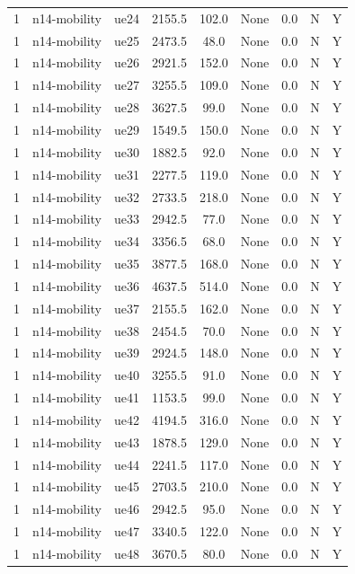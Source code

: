 \begin{table}[ht]
\begin{tabular}{|c|c|c|c|c|c|c|c|c|}
1 & n14-mobility & ue24 & 2155.5 & 102.0 & None & 0.0 & N & Y \\
1 & n14-mobility & ue25 & 2473.5 & 48.0 & None & 0.0 & N & Y \\
1 & n14-mobility & ue26 & 2921.5 & 152.0 & None & 0.0 & N & Y \\
1 & n14-mobility & ue27 & 3255.5 & 109.0 & None & 0.0 & N & Y \\
1 & n14-mobility & ue28 & 3627.5 & 99.0 & None & 0.0 & N & Y \\
1 & n14-mobility & ue29 & 1549.5 & 150.0 & None & 0.0 & N & Y \\
1 & n14-mobility & ue30 & 1882.5 & 92.0 & None & 0.0 & N & Y \\
1 & n14-mobility & ue31 & 2277.5 & 119.0 & None & 0.0 & N & Y \\
1 & n14-mobility & ue32 & 2733.5 & 218.0 & None & 0.0 & N & Y \\
1 & n14-mobility & ue33 & 2942.5 & 77.0 & None & 0.0 & N & Y \\
1 & n14-mobility & ue34 & 3356.5 & 68.0 & None & 0.0 & N & Y \\
1 & n14-mobility & ue35 & 3877.5 & 168.0 & None & 0.0 & N & Y \\
1 & n14-mobility & ue36 & 4637.5 & 514.0 & None & 0.0 & N & Y \\
1 & n14-mobility & ue37 & 2155.5 & 162.0 & None & 0.0 & N & Y \\
1 & n14-mobility & ue38 & 2454.5 & 70.0 & None & 0.0 & N & Y \\
1 & n14-mobility & ue39 & 2924.5 & 148.0 & None & 0.0 & N & Y \\
1 & n14-mobility & ue40 & 3255.5 & 91.0 & None & 0.0 & N & Y \\
1 & n14-mobility & ue41 & 1153.5 & 99.0 & None & 0.0 & N & Y \\
1 & n14-mobility & ue42 & 4194.5 & 316.0 & None & 0.0 & N & Y \\
1 & n14-mobility & ue43 & 1878.5 & 129.0 & None & 0.0 & N & Y \\
1 & n14-mobility & ue44 & 2241.5 & 117.0 & None & 0.0 & N & Y \\
1 & n14-mobility & ue45 & 2703.5 & 210.0 & None & 0.0 & N & Y \\
1 & n14-mobility & ue46 & 2942.5 & 95.0 & None & 0.0 & N & Y \\
1 & n14-mobility & ue47 & 3340.5 & 122.0 & None & 0.0 & N & Y \\
1 & n14-mobility & ue48 & 3670.5 & 80.0 & None & 0.0 & N & Y \\

\end{tabular}
\end{table}
